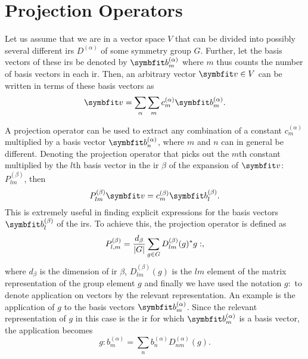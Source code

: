 \section{Projection Operators}
\label{sec:Group:Pro}

Let us assume that we are in a vector space $V$ that can be divided into possibly several different \ac{ir}s $D^{(\alpha)}$ of some
symmetry group $G$. Further, let the basis vectors of these \ac{ir}s be denoted by $\v{b}^{(\alpha)}_m$ where $m$ thus counts the number
of basis vectors in each \ac{ir}. Then, an arbitrary vector $\v{v}\in V$ can be written in terms of these basis vectors as
\begin{equation}
    \label{eq:Group:Irr:Pro:basisDecomp}
    \v{v} = \sum_\alpha\sum_m c_m^{(\alpha)}\v{b}^{(\alpha)}_m.
\end{equation}

A projection operator can be used to extract any combination of a constant $c_m^{(\alpha)}$ multiplied by a basis vector $\v{b}^{(\alpha)}_n$, where
$m$ and $n$ can in general be different. Denoting the projection operator that picks out the $m$th constant multiplied by the $l$th basis vector
in the \ac{ir} $\beta$ of the expansion of $\v{v}$: $P^{(\beta)}_{lm}$, then
\begin{equation}
    \label{eq:Group:Irr:Pro:generalProApplication}
    P^{(\beta)}_{lm}\v{v} = c_m^{(\beta)}\v{b}_l^{(\beta)}.
\end{equation}
This is extremely useful in finding explicit expressions for the basis vectors $\v{b}_l^{(\beta)}$ of the \ac{ir}s.
To achieve this, the projection operator is defined as
\begin{equation}
    \label{eq:Group:Irr:Pro:proOpDef}
    P^{(\beta)}_{l,m} = \frac{d_\beta}{\lvert G \rvert}\sum_{g\in G}D_{lm}^{(\beta)}(g)^\ast g:,
\end{equation}
where $d_\beta$ is the dimension of \ac{ir} $\beta$, $D_{lm}^{(\beta)}(g)$ is the $lm$ element of the matrix representation of the group element $g$ and
finally we have used the notation $g:$ to denote application on vectors by the relevant representation. An example is the application of $g$ to the
basis vectors $\v{b}_m^{(\alpha)}$. Since the relevant representation of $g$ in this case is the \ac{ir} for which $\v{b}_m^{(\alpha)}$ is
a basis vector, the application becomes
\begin{equation}
    \label{eq:Group:Irr:Pro:gApplication}
    g : b_m^{(\alpha)} = \sum_nb_n^{(\alpha)}D_{nm}^{(\alpha)}(g).
\end{equation}

